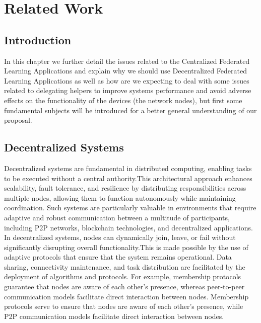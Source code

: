 

\chapter{Related Work}
\label{cha:users_manual}

\glsresetall


\section{Introduction}
\label{sec:introduction}

In this chapter we further detail the issues related to the Centralized Federated Learning Applications and explain why we should use Decentralized Federated Learning Applications as well as how are we expecting to deal with some issues related to delegating helpers to improve systems performance and avoid adverse effects on the functionality of the devices (the network nodes), but first some fundamental subjects will be introduced for a better general understanding of our proposal.


\section{Decentralized Systems}
\label{sec:decentralised_systems}

Decentralized systems are fundamental in distributed computing, enabling tasks to be executed without a central authority.This architectural approach enhances scalability, fault tolerance, and resilience by distributing responsibilities across multiple nodes, allowing them to function autonomously while maintaining coordination. Such systems are particularly valuable in environments that require adaptive and robust communication between a multitude of participants, including \gls{P2P} networks, blockchain technologies, and decentralized applications.\\

In decentralized systems, nodes can dynamically join, leave, or fail without significantly disrupting overall functionality.This is made possible by the use of adaptive protocols that ensure that the system remains operational. Data sharing, connectivity maintenance, and task distribution are facilitated by the deployment of algorithms and protocols. For example, membership protocols guarantee that nodes are aware of each other's presence, whereas peer-to-peer communication models facilitate direct interaction between nodes. Membership protocols serve to ensure that nodes are aware of each other's presence, while \gls{P2P} communication models facilitate direct interaction between nodes.\\

